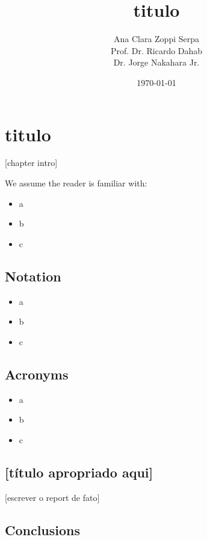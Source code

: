 \documentclass{report}
\title{titulo}
\author{Ana Clara Zoppi Serpa\\ Prof. Dr. Ricardo Dahab \\ Dr. Jorge Nakahara Jr.}
\date{\today}
\begin{document}
\maketitle

\tableofcontents

\chapter{titulo}

[chapter intro]

We assume the reader is familiar with:
\begin{itemize}
    \item a
    \item b
    \item c
\end{itemize}

\section{Notation}
\begin{itemize}
    \item a
    \item b
    \item c
\end{itemize}

\section{Acronyms}
\begin{itemize}
    \item a
    \item b
    \item c
\end{itemize}

\section{[título apropriado aqui]}

[escrever o report de fato]

\section{Conclusions}



\end{document}
